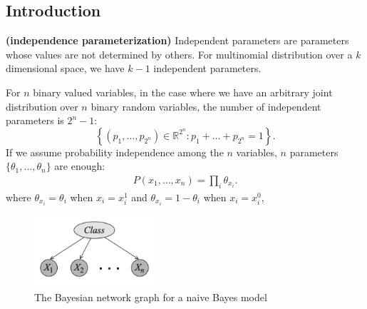 \documentclass{article}
\newcommand{\bfs}[1]{\textbf{({#1}) }}
\begin{document}
\subsection{Introduction}
\begin{exma}\bfs{independence parameterization}
Independent parameters are parameters whose values are not determined by others. For multinomial distribution over a $k$ dimensional space, we have $k-1$ independent parameters.

For $n$ binary valued variables, in the case where we have an arbitrary joint distribution over $n$ binary random variables, the number of independent parameters is $2^{n}-1$: $$\left\{\left(p_{1}, \ldots, p_{2^{n}}\right) \in \mathbb{R}^{2^{n}}: p_{1}+\ldots+p_{2^{n}}=1\right\}.$$ If we assume probability independence among the $n$ variables, $n$ parameters $\{\theta_1,...,\theta_n\}$ are enough:
\begin{align*}
P\left(x_{1}, \ldots, x_{n}\right)=\prod_{i} \theta_{x_{i}}.
\end{align*}
where $\theta_{x_{i}}=\theta_{i}$ when $x_{i}=x_{i}^{1}$ and $\theta_{x_{i}}=1-\theta_{i}$ when $x_{i}=x_{i}^{0}$,
\end{exma}

\begin{figure}
    \centering
    \includegraphics[width=0.4\textwidth]{Figs/a4.png}
    \caption{The Bayesian network graph for a naive Bayes model}
    \label{fig:naive_bayes}
\end{figure}
\end{document}
